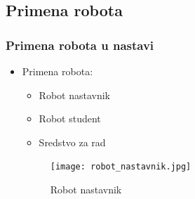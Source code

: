 \documentclass[10pt]{beamer}
\begin{document}
\subsection{Primena robota}
\begin{frame}[fragile]\frametitle{Primena robota u nastavi}

\begin{itemize}
    \item Primena robota:
    \begin{itemize}
        \item Robot nastavnik
        \item Robot student
        \item Sredstvo za rad
    \end{itemize}
    \begin{figure}[h!]
        \centering\texttt{[image: robot\_nastavnik.jpg]} 
        \caption{Robot nastavnik}
        \label{fig:robotnastavnik}
        \end{figure}
    
\end{itemize}
\end{frame}
\end{document}
